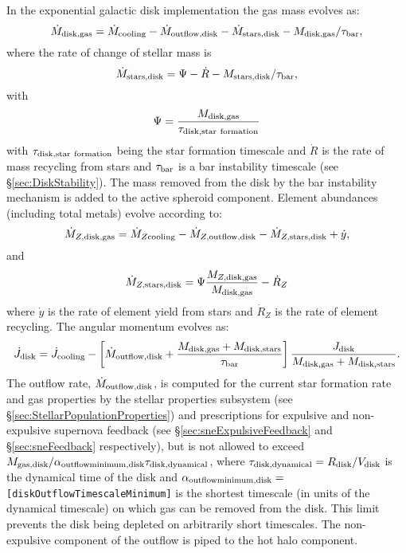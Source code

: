 In the exponential galactic disk implementation the gas mass evolves as:
\begin{equation}
 \dot{M}_{\rm disk, gas} = \dot{M}_{\rm cooling} - \dot{M}_{\rm outflow, disk} - \dot{M}_{\rm stars, disk} - M_{\rm disk, gas}/\tau_{\rm bar},
\end{equation}
where the rate of change of stellar mass is
\begin{equation}
 \dot{M}_{\rm stars, disk} = \Psi - \dot{R} - M_{\rm stars,disk}/\tau_{\rm bar},
\end{equation}
with
\begin{equation}
 \Psi = {M_{\rm disk, gas} \over \tau_{\rm disk, star~formation}}
\end{equation}
with $\tau_{\rm disk, star~formation}$ being the star formation timescale and $\dot{R}$ is the rate of mass recycling from stars and $\tau_{\rm bar}$ is a bar instability timescale (see \S\ref{sec:DiskStability}). The mass removed from the disk by the bar instability mechanism is added to the active spheroid component.
Element abundances (including total metals) evolve according to:
\begin{equation}
  \dot{M}_{Z, {\rm disk, gas}} = \dot{M}_{Z {\rm cooling}} - \dot{M}_{Z, {\rm outflow, disk}} - \dot{M}_{Z, {\rm stars, disk}} + \dot{y},
\end{equation}
and
\begin{equation}
 \dot{M}_{Z, {\rm stars, disk}} = \Psi {M_{Z, {\rm disk, gas}} \over M_{\rm disk, gas}} - \dot{R}_Z
\end{equation}
where $\dot{y}$ is the rate of element yield from stars and $\dot{R}_Z$ is the rate of element recycling. The angular momentum evolves as:
\begin{equation}
 \dot{J}_{\rm disk} = \dot{J}_{\rm cooling} - \left[ \dot{M}_{\rm outflow, disk} + {M_{\rm disk, gas}  + M_{\rm disk, stars} \over \tau_{\rm bar}}\right] {J_{\rm disk} \over M_{\rm disk, gas} + M_{\rm disk, stars}}.
\end{equation}
The outflow rate, $\dot{M}_{\rm outflow, disk}$, is computed for the current star formation rate and gas properties by the stellar properties subsystem (see \S\ref{sec:StellarPopulationProperties}) and prescriptions for expulsive and non-expulsive supernova feedback (see \S\ref{sec:sneExpulsiveFeedback} and \S\ref{sec:sneFeedback} respectively), but is not allowed to exceed $M_{\rm gas, disk}/ \alpha_{\rm outflow minimum, disk} \tau_{\rm disk, dynamical}$, where $\tau_{\rm disk, dynamical}=R_{\rm disk}/V_{\rm disk}$ is the dynamical time of the disk and $\alpha_{\rm outflow minimum, disk}=${\tt [diskOutflowTimescaleMinimum]} is the shortest timescale (in units of the dynamical timescale) on which gas can be removed from the disk. This limit prevents the disk being depleted on arbitrarily short timescales. The non-expulsive \gls{component} of the outflow is piped to the hot halo component.

